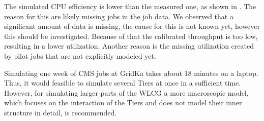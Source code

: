 \documentclass[a4paper]{jpconf}
\begin{document}
The simulated CPU efficiency is lower than the measured one, as shown in . The reason for this are likely missing jobs in the job data. We observed that a significant amount of data is missing, the cause for this is not known yet, however this should be investigated. Because of that the calibrated throughput is too low, resulting in a lower utilization. Another reason is the missing utilization created by pilot jobs that are not explicitly modeled yet.

Simulating one week of CMS jobs at GridKa takes about 18 minutes on a laptop. Thus, it would feasible to simulate several Tiers at once in a sufficient time. However, for simulating larger parts of the WLCG a more macroscopic model, which focuses on the interaction of the Tiers and does not model their inner structure in detail,
is recommended. 
\end{document}

